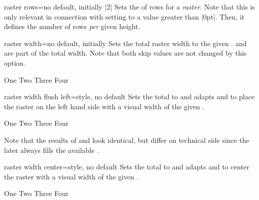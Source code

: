 \begin{docTcbKey}[][doc new=2014-11-10]{raster rows}{=}{no default, initially |2|}
  Sets the  of rows for a \emph{raster}.
  Note that this is only relevant in connection with setting 
  to a value greater than |0pt|. Then, it defines the number of rows \emph{per} given
  height.
\end{docTcbKey}


\begin{docTcbKey}[][doc new=2014-11-10]{raster width}{=}{no default, initially }
  Sets the total raster width to the given .
   and  are part
  of the total width. Note that both skip values are not changed by this option.
\begin{dispExample}
\begin{tcbitemize}[raster width=\linewidth/2,
  size=small,colframe=red!50!black,colback=red!10!white]
  \tcbitem One
  \tcbitem Two
  \tcbitem Three
  \tcbitem Four
\end{tcbitemize}
\end{dispExample}
\end{docTcbKey}


\clearpage
\begin{docTcbKey}[][doc new=2018-11-30]{raster width flush left}{=}{style, no default}
  Sets the total  to  and adapts
   and  to
  place the raster on the left hand side
  with a visual width of the given .
\begin{dispExample}
\begin{tcbitemize}[raster width flush left=\linewidth/2,
  size=small,colframe=red!50!black,colback=red!10!white]
  \tcbitem One
  \tcbitem Two
  \tcbitem Three
  \tcbitem Four
\end{tcbitemize}
\end{dispExample}
Note that the results of  and 
look identical, but differ on technical side since the later always fills
the available .
\end{docTcbKey}


\begin{docTcbKey}[][doc new=2018-11-30]{raster width center}{=}{style, no default}
  Sets the total  to  and adapts
   and  to center
  the raster with a visual width of the given .
\begin{dispExample}
\begin{tcbitemize}[raster width center=\linewidth/2,
  size=small,colframe=red!50!black,colback=red!10!white]
  \tcbitem One
  \tcbitem Two
  \tcbitem Three
  \tcbitem Four
\end{tcbitemize}
\end{dispExample}
\end{docTcbKey}


